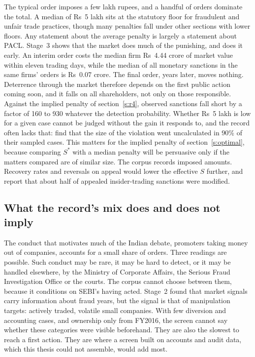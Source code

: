 \documentclass[letterpaper,11pt,leqno]{article}
\begin{document}
The typical order imposes a few lakh rupees, and a handful of orders dominate the total. A median of Rs~5 lakh sits at the statutory floor for fraudulent and unfair trade practices, though many penalties fall under other sections with lower floors. Any statement about the average penalty is largely a statement about PACL. Stage~3 shows that the market does much of the punishing, and does it early. An interim order costs the median firm Rs~4.44 crore of market value within eleven trading days, while the median of all monetary sanctions in the same firms' orders is Rs~0.07 crore. The final order, years later, moves nothing. Deterrence through the market therefore depends on the first public action coming soon, and it falls on all shareholders, not only on those responsible. Against the implied penalty of section~\ref{s:r4}, observed sanctions fall short by a factor of 160 to 930 whatever the detection probability. Whether Rs~5 lakh is low for a given case cannot be judged without the gain it responds to, and the record often lacks that: \citet{DZ22} find that the size of the violation went uncalculated in 90\% of their sampled cases. This matters for the implied penalty of section~\ref{s:optimal}, because comparing $S^{*}$ with a median penalty will be persuasive only if the matters compared are of similar size. The corpus records imposed amounts. Recovery rates and reversals on appeal would lower the effective $S$ further, and \citet{AKPPS25} report that about half of appealed insider-trading sanctions were modified.

\subsection{What the record's mix does and does not imply}

The conduct that motivates much of the Indian debate, promoters taking money out of companies, accounts for a small share of orders. Three readings are possible. Such conduct may be rare, it may be hard to detect, or it may be handled elsewhere, by the Ministry of Corporate Affairs, the Serious Fraud Investigation Office or the courts. The corpus cannot choose between them, because it conditions on SEBI's having acted. Stage~2 found that market signals carry information about fraud years, but the signal is that of manipulation targets: actively traded, volatile small companies. With few diversion and accounting cases, and ownership only from FY2016, the screen cannot say whether these categories were visible beforehand. They are also the slowest to reach a first action. They are where a screen built on accounts and audit data, which this thesis could not assemble, would add most.
\end{document}
